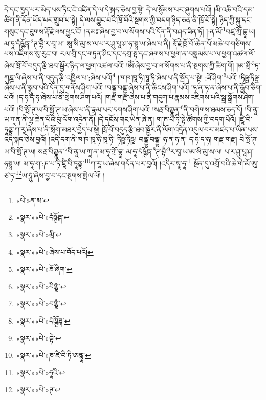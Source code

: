 དེ་དང་ཁྱད་པར་མེད་པས་ཏིང་ངེ་འཛིན་དེ་ལ་དེ་སྐད་ཅེས་བྱ་སྟེ། དེ་ལ་སྙོམས་པར་ཞུགས་པའོ། །མི་འཆི་བའི་དམ་ཚིག་ནི་དོན་ཡོད་པར་གྲུབ་པ་སྟེ། དེ་ལས་བྱུང་བའི་ཁྲོ་བོའི་སྔགས་ཀྱི་བདག་ཉིད་ཅན་ནི་ཁྲོ་བོ་སྟེ། ཉིད་ཀྱི་སྐུ་དང་གསུང་དང་ཐུགས་རྡོ་རྗེ་ལས་ཕྱུང་ངོ། །ནམཿ་ཞེས་བྱ་བ་ལ་སོགས་པའི་དོན་ནི་བཤད་ཟིན་ཏོ། །:ན་མོ་\footnote{«པེ་»ན་མ་}བཛྲ་ཀྲོ་དྷཱ་ཡ། མ་ཧཱ་དཾཥྚོཏྐ་\footnote{«སྣར་»«པེ་»དཾཥྚྲོཊྐ་}ཊ་བྷཻ་ར་བཱ་ཡ། ཨཱ་སི་མུ་ས་ལ་པ་ར་ཤུ་པཱ་ཤ་ཧ་སྟཱ་ཡ་ཞེས་པ་ནི། རྡོ་རྗེ་ཁྲོ་བོ་ཆེན་པོ་མཆེ་བ་གཙིགས་པས་འཇིགས་སུ་རུང་བ། རལ་གྲི་དང་གཏུན་ཤིང་དང་དགྲ་སྟ་དང་ཞགས་པ་ཕྱག་ན་བསྣམས་པ་ལ་ཕྱག་འཚལ་ལོ་ཞེས་ཁྲོ་བོ་བདུད་རྩི་ཐབ་སྦྱོར་ཉིད་ལ་ཕྱག་འཚལ་བའོ། །ཨོཾ་ཞེས་བྱ་བ་ལ་སོགས་པ་ནི་སྔགས་ཀྱི་ཚིག་གོ། །ཨ་མྲྀ་\footnote{«སྣར་»«པེ་»མྲི་}ཏ་ཀུཎྜ་ལི་ཞེས་པ་ནི་བདུད་རྩི་འཁྱིལ་པ་:ཞེས་པའོ།\footnote{«སྣར་»«པེ་»ཞེས་པ་བོད་པའོ།} །ཁ་ཁ་ཁཱ་ཧི་ཁཱ་ཧི་ཞེས་པ་ནི་སྦོད་པ་སྟེ། :ཟོ་ཤིག་\footnote{«སྣར་»«པེ་»ཟོ་ཞིག་}པའོ། །ཏིཥྛ་ཏིཥྛ་ཞེས་པ་ནི་སྒྲུབ་པའི་དོན་དུ་གནོས་ཤིག་པའོ། །བནྡྷ་བནྡྷ་ཞེས་པ་ནི་ཆིངས་ཤིག་པའོ། །ཧ་ན་ཧ་ན་ཞེས་པ་ནི་རྒྱོབ་ཅིག་པའོ། །ད་ཧ་ད་ཧ་ཞེས་པ་ནི་སྲེགས་ཤིག་པའོ། །གརྫ་གརྫ་ཞེས་པ་ནི་གདུག་པ་རྣམས་འཇིགས་པའི་སྒྲ་སྒྲོགས་ཤིག་པའོ། །བི་སྥོ་ཊ་ཡ་བི་སྥོ་ཊ་ཡ་ཞེས་པ་ནི་རྣམ་པར་དགས་ཤིག་པའོ། །སརྦ་བིགྷྣཱན་\footnote{«སྣར་»«པེ་»བིགྷྣཾ་}ནི་བགེགས་ཐམས་ཅད་དོ། །བི་ནཱ་ཡ་ཀཱན་ནི་ལྷ་ཆེན་པོའི་བུ་ལོག་འདྲེན་ནོ། །དེ་དངོས་གང་ཡིན་ཞེ་ན། ག་ཎ་པ་ཏི་སྟེ་ཚོགས་ཀྱི་བདག་པོའོ། །ཛཱི་བི་ཏཱནྟ་ཀ་རཱ་ཞེས་པ་ནི་སྲོག་མཐར་བྱེད་པ་སྟེ། ཁྲོ་བོ་བདུད་རྩི་ཐབ་སྦྱོར་ནི་ལོག་འདྲེན་འདུལ་བར་མཛད་པ་ཡིན་པས་འདི་སྐད་ཅེས་བྱའོ། །འདི་དག་ནི་ཁ་ཁ་ཁཱ་ཧི་ཁཱ་ཧི། ཏིཥྛ་ཏིཥྛ། བནྡྷ་བནྡྷ། ཧ་ན་ཧ་ན། ད་ཧ་ད་ཧ། གརྫ་གརྫ། བི་སྥོ་ཊ་ཡ་བི་སྥོ་ཊ་ཡ། སརྦ་བིགྷྣཱན་\footnote{«སྣར་»«པེ་»བགྷྣཾ་}བི་ནཱ་ཡ་ཀཱ་ན་མ་ཧཱ་ཀྲོ་དྷཱ། མ་ཧཱ་དཾཥྚོཏྐ་\footnote{«སྣར་»«པེ་»དཾཁྚྲོཊྐ་}ཊ་བྷཻ་\footnote{«སྣར་»«པེ་»བྷེ་}ར་བཱ་ཡ་ཨ་སི་མུ་ས་ལ། པ་ར་ཤུ་པཱ་ཤ་ཧསྟཱ་ཡ། མ་ཧཱ་ག་:ཎ་པ་ཏི་ཛཱི་བི་ཏཱནྟ་\footnote{«སྣར་»«པེ་»ཎ་ཛི་བི་ཏི་ཨནྷཱ་}ཀ་རཱ་ཡ་ཞེས་གདོན་པར་བྱའོ། །འདིར་སྭཱ་ཧཱ་\footnote{«སྣར་»«པེ་»ཧཱའི་}སྔོན་དུ་འགྲོ་བའི་ཆེ་གེ་མོ་ཨུ་ཙ་ཏ་\footnote{«སྣར་»«པེ་»ཊ་}ཡ་ཧཱུཾ་ཞེས་བྱ་བ་དང་སྔགས་སྤེལ་ལོ། །
